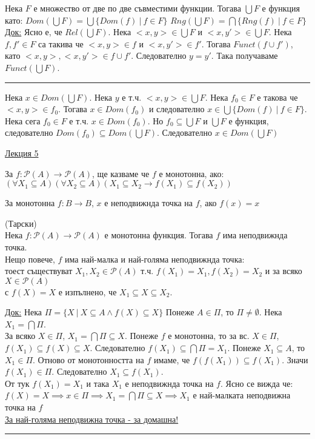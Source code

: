 \documentclass[fleqn, titlepage, 12pt]{report}
\begin{document}
 Нека $F$ е множество от две по две съвместими функции. Тогава $ \bigcup F $ е функция като:
$ Dom(\bigcup F) = \bigcup \{Dom(f)\ |\ f \in F\} $
$ Rng(\bigcup F) = \bigcap \{Rng(f)\ |\ f \in F\} $
\bigbreak
\underline{Док:} Ясно е, че $Rel(\bigcup F)$. Нека $<x,y> \in \bigcup F$ и $<x,y'> \in \bigcup F$.
Нека $f, f' \in F$ са такива че $<x,y> \in f$ и $<x,y'> \in f'$. Тогава $Funct(f \cup f')$,
като $<x,y>,<x,y'> \in f \cup f'$. Следователно $y = y'$. Така получаваме $Funct(\bigcup F)$.
\bigbreak
\hrule
\bigbreak

Нека $x \in Dom(\bigcup F)$. Нека $y$ е т.ч. $ <x,y> \in \bigcup F $. Нека $f_0 \in F$ е такова че $<x,y> \in f_0$.
Тогава $x \in Dom(f_0)$ и следователно $x \in \bigcup \{Dom(f)\ |\ f \in F\}$.
Нека сега $f_0 \in F$ е т.ч. $x \in Dom(f_0)$. Но $f_0 \subseteq \bigcup F$ и $ \bigcup F$ е функция, следователно
$Dom(f_0) \subseteq Dom(\bigcup F)$. Следователно $x \in Dom(\bigcup F)$

\begin{center}
  \underline{\huge\normalfont Лекция 5}
\end{center}
\bigbreak

За $f : \mathcal{P}(A) \rightarrow \mathcal{P}(A)$, ще казваме че $f$ е монотонна, ако: \\
$ (\forall{X_1 \subseteq A})(\forall{X_2 \subseteq A})(X_1 \subseteq X_2 \rightarrow f(X_1) \subseteq f(X_2)) $
\bigbreak

За монотонна $f : B \rightarrow B$, $ x $ е неподвижнда точка на $ f $, ако $f(x) = x$
\bigbreak

 (Тарски)\\
Нека $f: \mathcal{P}(A) \rightarrow \mathcal{P}(A)$ е монотонна функция. Тогава $f$ има неподвижнда точка.\\
Нещо повече, $ f$ има най-малка и най-голяма неподвижнда точка:\\
тоест съществуват $X_1,X_2 \in \mathcal{P}(A)$ т.ч.
$f(X_1) = X_1, f(X_2) = X_2$ и за всяко $X \in \mathcal{P}(A)$\\
с $f(X) = X$ е изпълнено, че $X_1 \subseteq X \subseteq X_2$.
\bigbreak

\underline{Док:} Нека $\Pi = \{X\ |\ X \subseteq A \land f(X) \subseteq X\}$
Понеже $A \in \Pi$, то $\Pi \neq \emptyset$. Нека $X_1 = \bigcap \Pi$.\\
За всяко $X \in \Pi$, $X_1 = \bigcap \Pi \subseteq X$. Понеже $f$ е монотонна,
то за вс. $X \in \Pi$, $f(X_1) \subseteq f(X) \subseteq X$. Следователно $f(X_1) \subseteq \bigcap \Pi = X_1$.
Понеже $X_1 \subseteq A$, то $X_1 \in \Pi$. Отново от монотонността на $f$ имаме, че
$f(f(X_1)) \subseteq f(X_1)$. Значи $f(X_1) \in \Pi$. Следователно $X_1 \subseteq f(X_1)$.\\
От тук $f(X_1) = X_1$ и така $X_1$ е неподвижнда точка на $f$. Ясно се вижда че:\\
$f(X) = X \implies x \in \Pi \implies X_1 = \bigcap \Pi \subseteq X \implies X_1$ е най-малката неподвижна точка на $f$\\
\underline{За най-голяма неподвижна точка - за домашна!}
\bigbreak
\hrule
\bigbreak
\end{document}

